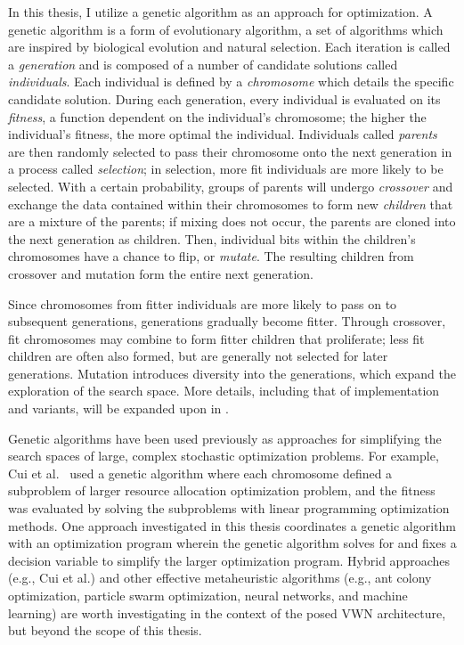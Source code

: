 \documentclass[12pt,dvipsnames]{report}
\begin{document}
In this thesis, I utilize a genetic algorithm as an approach for optimization.  A genetic algorithm is a form of evolutionary algorithm, a set of algorithms which are inspired by biological evolution and natural selection.  Each iteration is called a \emph{generation} and is composed of a number of candidate solutions called \emph{individuals}.  Each individual is defined by a \emph{chromosome} which details the specific candidate solution.  During each generation, every individual is evaluated on its \emph{fitness}, a function dependent on the individual's chromosome; the higher the individual's fitness, the more optimal the individual.  Individuals called \emph{parents} are then randomly selected to pass their chromosome onto the next generation in a process called \emph{selection}; in selection, more fit individuals are more likely to be selected.  With a certain probability, groups of parents will undergo \emph{crossover} and exchange the data contained within their chromosomes to form new \emph{children} that are a mixture of the parents; if mixing does not occur, the parents are cloned into the next generation as children.  Then, individual bits within the children's chromosomes have a chance to flip, or \emph{mutate}.  The resulting children from crossover and mutation form the entire next generation.

Since chromosomes from fitter individuals are more likely to pass on to subsequent generations, generations gradually become fitter.  Through crossover, fit chromosomes may combine to form fitter children that proliferate; less fit children are often also formed, but are generally not selected for later generations.  Mutation introduces diversity into the generations, which expand the exploration of the search space.  More details, including that of implementation and variants, will be expanded upon in .

Genetic algorithms have been used previously as approaches for simplifying the search spaces of large, complex stochastic optimization problems.  For example, Cui et al.~\cite{7257198} used a genetic algorithm where each chromosome defined a subproblem of larger resource allocation optimization problem, and the fitness was evaluated by solving the subproblems with linear programming optimization methods.  One approach investigated in this thesis coordinates a genetic algorithm with an optimization program wherein the genetic algorithm solves for and fixes a decision variable to simplify the larger optimization program.  Hybrid approaches (e.g., Cui et al.) and other effective metaheuristic algorithms (e.g., ant colony optimization, particle swarm optimization, neural networks, and machine learning) are worth investigating in the context of the posed VWN architecture, but beyond the scope of this thesis.
\end{document}
